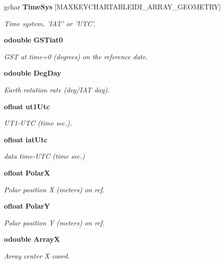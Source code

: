 \begin{CompactItemize}
gchar {\bf Time\-Sys} [MAXKEYCHARTABLEIDI\_\-ARRAY\_\-GEOMETRY]
\begin{CompactList}\small\item\em Time system, 'IAT' or 'UTC'. \item\end{CompactList}\item 
{\bf odouble} {\bf GSTiat0}
\begin{CompactList}\small\item\em GST at time=0 (degrees) on the reference date. \item\end{CompactList}\item 
{\bf odouble} {\bf Deg\-Day}
\begin{CompactList}\small\item\em Earth rotation rate (deg/IAT day). \item\end{CompactList}\item 
{\bf ofloat} {\bf ut1Utc}
\begin{CompactList}\small\item\em UT1-UTC (time sec.). \item\end{CompactList}\item 
{\bf ofloat} {\bf iat\-Utc}
\begin{CompactList}\small\item\em data time-UTC (time sec.) \item\end{CompactList}\item 
{\bf ofloat} {\bf Polar\-X}
\begin{CompactList}\small\item\em Polar position X (meters) on ref. \item\end{CompactList}\item 
{\bf ofloat} {\bf Polar\-Y}
\begin{CompactList}\small\item\em Polar position Y (meters) on ref. \item\end{CompactList}\item 
{\bf odouble} {\bf Array\-X}
\begin{CompactList}\small\item\em Array center X coord. \item\end{CompactList}\item 

\end{CompactItemize}
